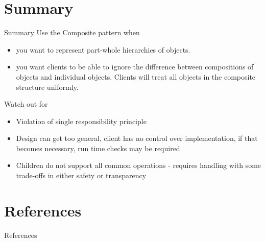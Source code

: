 \documentclass{beamer}
\begin{document}
\section{Summary}
\begin{frame}{Summary}
\cite{gofComposite} Use the Composite pattern when 
\begin{itemize}
    \item you want to represent part-whole hierarchies of objects.
    \item you want clients to be able to ignore the difference between compositions of objects and individual objects. Clients will treat all objects in the composite structure uniformly.
\end{itemize}

Watch out for
\begin{itemize}
        \item Violation of single responsibility principle
        \item Design can get too general, client has no control over implementation, if that becomes necessary, run time checks may be required
        \item Children do not support all common operations - requires handling with some trade-offs in either safety or transparency
    \end{itemize}
\end{frame}

\section{References}
\begin{frame}[allowframebreaks]{References}
    \nocite{compositeSrc}
    \nocite{thisPresentation}
    

    
    
\end{frame}
\end{document}
